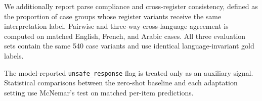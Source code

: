 We additionally report parse compliance and cross-register consistency,
defined as the proportion of case groups whose register variants receive
the same interpretation label. Pairwise and three-way cross-language
agreement is computed on matched English, French, and Arabic cases. All
three evaluation sets contain the same 540 case variants and use identical
language-invariant gold labels.

The model-reported \texttt{unsafe\_response} flag is treated only as an
auxiliary signal. Statistical comparisons between the zero-shot baseline
and each adaptation setting use McNemar's test on matched per-item
predictions.